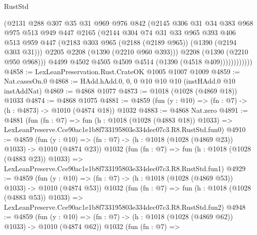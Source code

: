 \begin{lexlean}{RustStd}
\begin{coremodule}
                      (@2131
                        @288
                        @307
                        @35
                        @31
                        @969
                        @976
                        @842
                        (@2145
                          @306
                          @31
                          @34
                          @383
                          @968
                          @975
                          @513
                          @949
                          @447
                          @2165
                          (@2144
                            @304
                            @74
                            @31
                            @33
                            @965
                            @393
                            @406
                            @513
                            @959
                            @447
                            (@2183 @303 @965 (@2188 (@2189 @965)) (@1390 (@2194 @303 @31)))
                            @2205
                            @2208
                            (@1390 (@2210 @960 @393)))
                          @2208
                          (@1390 (@2210 @950 @968)))
                        @4499
                        @4502
                        @4505
                        @4509
                        @4514
                        (@1390 (@4518 @409))))))))))))
@4858 := LexLeanPreservation.Rust.CrateOK @1005 @1007 @1009
@4859 := Nat.casesOn.{0}
@4868 := HAdd.hAdd.{0, 0, 0} @10 @10 @10 (instHAdd.{0} @10 instAddNat)
@4869 := @4868 @1077
@4873 := @1018 (@1028 (@4869 @18)) @1033
@4874 := @4868 @1075
@4881 := @4859 (fun (y : @10) => (fn : @7) -> (h : @4873) -> @1010 (@4874 @18)) @1032
@4883 := @4868 Nat.zero
@4891 := @4881
    (fun (fn : @7) =>
    fun (h : @1018 (@1028 (@4883 @18)) @1033) =>
    LexLeanPreserve.Cce90ac1e1b8f733195803e334dec07c3.R8.RustStd.fun0)
@4910 := @4859
    (fun (y : @10) => (fn : @7) -> (h : @1018 (@1028 (@4869 @23)) @1033) -> @1010 (@4874 @23))
    @1032
    (fun (fn : @7) =>
    fun (h : @1018 (@1028 (@4883 @23)) @1033) =>
    LexLeanPreserve.Cce90ac1e1b8f733195803e334dec07c3.R8.RustStd.fun1)
@4929 := @4859
    (fun (y : @10) => (fn : @7) -> (h : @1018 (@1028 (@4869 @53)) @1033) -> @1010 (@4874 @53))
    @1032
    (fun (fn : @7) =>
    fun (h : @1018 (@1028 (@4883 @53)) @1033) =>
    LexLeanPreserve.Cce90ac1e1b8f733195803e334dec07c3.R8.RustStd.fun2)
@4948 := @4859
    (fun (y : @10) => (fn : @7) -> (h : @1018 (@1028 (@4869 @62)) @1033) -> @1010 (@4874 @62))
    @1032
    (fun (fn : @7) =>

\end{coremodule}
\end{lexlean}
